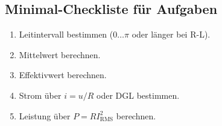 \subsection{Minimal-Checkliste für Aufgaben}

\begin{enumerate}
    \item Leitintervall bestimmen ($0 \ldots \pi$ oder länger bei R-L).
    \item Mittelwert berechnen.
    \item Effektivwert berechnen.
    \item Strom über $i=u/R$ oder DGL bestimmen.
    \item Leistung über $P=R I_{\mathrm{RMS}}^2$ berechnen.
\end{enumerate}
